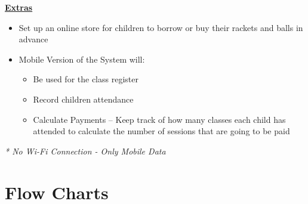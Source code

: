 \documentclass{l3proj}
\begin{document}
\textbf{\underline{Extras}}
	\begin{itemize}
		\item Set up an online store for children to borrow or buy their rackets and balls in advance
		\item Mobile Version of the System will:
		\begin{itemize}
			\item Be used for the class register
			\item Record children attendance
			\item Calculate Payments -- Keep track of how many classes each child has attended to calculate the number of sessions that are going to be paid
		\end{itemize}
	\end{itemize}
\emph{* No Wi-Fi Connection - Only Mobile Data}\\
\noindent\makebox[\linewidth]{\rule{\paperwidth}{0.4pt}}
\pagebreak

\section{Flow Charts}

\end{document}
